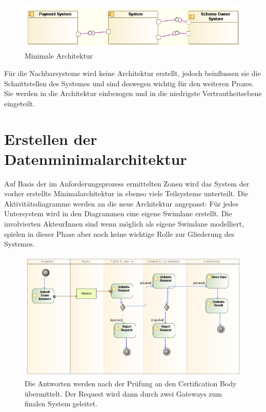 \begin{figure}[H]
    \centering
    \includegraphics[scale=0.7]{uml/minimalarch.png}
    \caption{Minimale Architektur}
\end{figure}

Für die Nachbarsysteme wird keine Architektur erstellt, jedoch beinflussen sie die Schnittstellen des Systemes und sind deswegen wichtig für den weiteren Prozes. Sie werden in die Architektur einbezogen und in die niedrigste Vertrautheitsebene eingeteilt.

\section{Erstellen der Datenminimalarchitektur}
Auf Basis der im Anforderungsprozess ermittelten Zonen wird das System der vorher erstellte Minimalarchitektur in ebenso viele Teilsysteme unterteilt. Die Aktivitätsdiagramme werden an die neue Architektur angepasst: Für jedes Untersystem wird in den Diagrammen eine eigene Swimlane erstellt. Die involvierten AkteurInnen sind wenn möglich als eigene Swimlane modelliert, spielen in dieser Phase aber noch keine wichtige Rolle zur Gliederung des Systemes.

\begin{figure}[H]
    \centering
    \includegraphics[scale=0.5]{uml/takeexamactivity1.png}
    \caption{Die Antworten werden nach der Prüfung an den Certification Body übermittelt. Der Request wird dann durch zwei Gateways zum finalen System geleitet.}
\end{figure}

